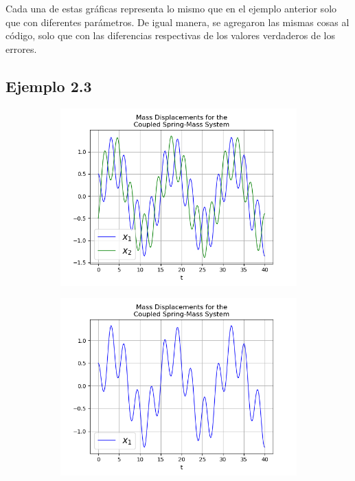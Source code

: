 \documentclass{article}
\begin{document}
\begin{figure}[h!]
\begin{subfigure}[b]{0.45\linewidth}
    \caption{}
  \end{subfigure}
\end{figure}

Cada una de estas gráficas representa lo mismo que en el ejemplo anterior solo que con diferentes parámetros. De igual manera, se agregaron las mismas cosas al código, solo que con las diferencias respectivas de los valores verdaderos de los errores.

\subsection*{Ejemplo 2.3}

\begin{figure}[h!]
  \centering
  \begin{subfigure}[b]{0.32\linewidth}
    \includegraphics[width=\linewidth]{two_springs231.png}
     \caption{}
  \end{subfigure}
  \begin{subfigure}[b]{0.32\linewidth}
    \includegraphics[width=\linewidth]{two_springs232.png}

\end{subfigure}
\end{figure}
\end{document}
